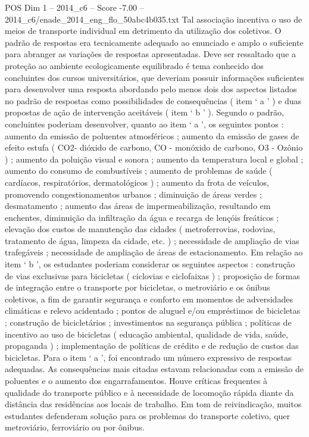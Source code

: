 \begin{textsample}{POS Dim 1 – 2014\_c6 – Score -7.00 – 2014\_c6/enade\_2014\_eng\_flo\_50abc4b035.txt}
Tal associação incentiva o uso de meios de transporte individual em detrimento da utilização dos coletivos.
O padrão de respostas era tecnicamente adequado ao enunciado e amplo o suficiente para abranger as variações de respostas apresentadas.
Deve ser ressaltado que a proteção ao ambiente ecologicamente equilibrado é tema conhecido dos concluintes dos cursos universitários, que deveriam possuir informações suficientes para desenvolver uma resposta abordando pelo menos dois dos aspectos listados no padrão de respostas como possibilidades de consequências ( item ‘ a ’ ) e duas propostas de ação de intervenção aceitáveis ( item ‘ b ’ ).
Segundo o padrão, concluintes poderiam desenvolver, quanto ao item ‘ a ’, os seguintes pontos : aumento da emissão de poluentes atmosféricos ; aumento da emissão de gases de efeito estufa ( CO2- dióxido de carbono, CO - monóxido de carbono, O3 - Ozônio ) ; aumento da poluição visual e sonora ; aumento da temperatura local e global ; aumento do consumo de combustíveis ; aumento de problemas de saúde ( cardíacos, respiratórios, dermatológicos ) ; aumento da frota de veículos, promovendo congestionamentos urbanos ; diminuição de áreas verdes ; desmatamento ; aumento das áreas de impermeabilização, resultando em enchentes, diminuição da infiltração da água e recarga de lençóis freáticos ; elevação dos custos de manutenção das cidades ( metroferrovias, rodovias, tratamento de água, limpeza da cidade, etc. ) ; necessidade de ampliação de vias trafegáveis ; necessidade de ampliação de áreas de estacionamento.
Em relação ao item ‘ b ’, os estudantes poderiam considerar os seguintes aspectos : construção de vias exclusivas para bicicletas ( ciclovias e ciclofaixas ) ; proposição de formas de integração entre o transporte por bicicletas, o metroviário e os ônibus coletivos, a fim de garantir segurança e conforto em momentos de adversidades climáticas e relevo acidentado ; pontos de aluguel e/ou empréstimos de bicicletas ; construção de bicicletários ; investimentos na segurança pública ; políticas de incentivo ao uso de bicicletas ( educação ambiental, qualidade de vida, saúde, propaganda ) ; implementação de políticas de crédito e de redução de custos das bicicletas.
Para o item ‘ a ’, foi encontrado um número expressivo de respostas adequadas.
As consequências mais citadas estavam relacionadas com a emissão de poluentes e o aumento dos engarrafamentos.
Houve críticas frequentes à qualidade do transporte público e à necessidade de locomoção rápida diante da distância das residências aos locais de trabalho.
Em tom de reivindicação, muitos estudantes defenderam solução para os problemas do transporte coletivo, quer metroviário, ferroviário ou por ônibus.

\end{textsample}
